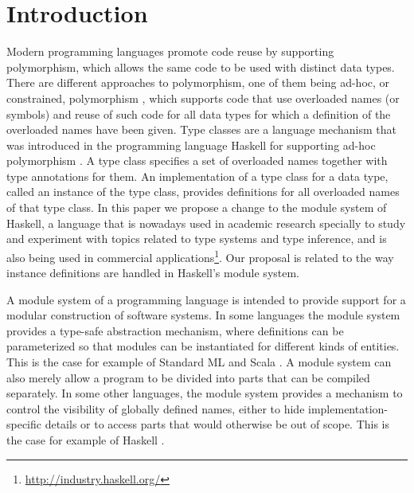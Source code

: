 \documentclass[msc]{ppgccufmg}
\begin{document}

\chapter{Introduction}

Modern programming languages promote code reuse by supporting
polymorphism, which allows the same code to be used with distinct data
types. There are different approaches to polymorphism, one of them
being ad-hoc, or constrained, polymorphism \citep{wadler}, which supports
code that use overloaded names (or symbols) and reuse of such code for
all data types for which a definition of the overloaded names have
been given. Type classes are a language mechanism that was introduced
in the programming language Haskell for supporting ad-hoc
polymorphism \citep{tch}. A type class specifies a set of overloaded
names together with type annotations for them. An implementation of a
type class for a data type, called an instance of the type class,
provides definitions for all overloaded names of that type class. In
this paper we propose a change to the module system of Haskell, a
language that is nowadays used in academic
research specially to study and experiment with topics related to
type systems and type inference, and is also being used in commercial
applications\footnote{\url{http://industry.haskell.org/}}.  Our
proposal is related to the way instance definitions are handled in
Haskell's module system.

A module system of a programming language is intended to provide
support for a modular construction of software systems.  In some
languages the module system provides a type-safe abstraction
mechanism, where definitions can be parameterized so that
modules can be instantiated for different kinds of
entities. This is the case for example of Standard ML \citep{sml} and
Scala \citep{scala}. A module system can also merely allow a program to
be divided into parts that can be compiled separately. In some other
languages, the module system provides a mechanism to control the
visibility of globally defined names, either to hide
implementation-specific details or to access parts that would
otherwise be out of scope. This is the case for example of Haskell
\citep[chapter~5]{report}.
\end{document}
